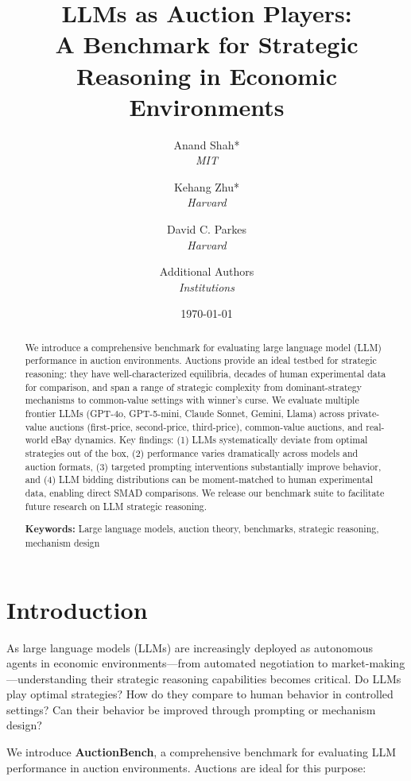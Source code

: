 \documentclass[12pt]{article}
\title{LLMs as Auction Players: \\
\large A Benchmark for Strategic Reasoning in Economic Environments}
\author{
Anand Shah*\\
\textit{MIT}
\and
Kehang Zhu*\\
\textit{Harvard}
\and
David C. Parkes\\
\textit{Harvard}
\and
Additional Authors\\
\textit{Institutions}
}
\date{\today}
\begin{document}
\maketitle

\begin{abstract}
We introduce a comprehensive benchmark for evaluating large language model (LLM) performance in auction environments. Auctions provide an ideal testbed for strategic reasoning: they have well-characterized equilibria, decades of human experimental data for comparison, and span a range of strategic complexity from dominant-strategy mechanisms to common-value settings with winner's curse. We evaluate multiple frontier LLMs (GPT-4o, GPT-5-mini, Claude Sonnet, Gemini, Llama) across private-value auctions (first-price, second-price, third-price), common-value auctions, and real-world eBay dynamics. Key findings: (1) LLMs systematically deviate from optimal strategies out of the box, (2) performance varies dramatically across models and auction formats, (3) targeted prompting interventions substantially improve behavior, and (4) LLM bidding distributions can be moment-matched to human experimental data, enabling direct SMAD comparisons. We release our benchmark suite to facilitate future research on LLM strategic reasoning.

\medskip
\noindent\textbf{Keywords:} Large language models, auction theory, benchmarks, strategic reasoning, mechanism design
\end{abstract}

\section{Introduction}

As large language models (LLMs) are increasingly deployed as autonomous agents in economic environments---from automated negotiation to market-making---understanding their strategic reasoning capabilities becomes critical. Do LLMs play optimal strategies? How do they compare to human behavior in controlled settings? Can their behavior be improved through prompting or mechanism design?

We introduce \textbf{AuctionBench}, a comprehensive benchmark for evaluating LLM performance in auction environments. Auctions are ideal for this purpose:
\end{document}
